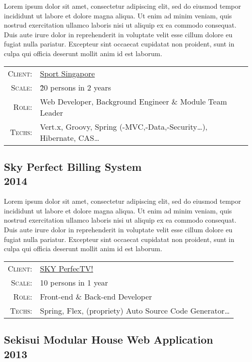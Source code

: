 \documentclass[a4paper,10pt]{article}
\begin{document}
Lorem ipsum dolor sit amet, consectetur adipiscing elit, sed do eiusmod tempor incididunt ut labore et dolore magna aliqua. Ut enim ad minim veniam, quis nostrud exercitation ullamco laboris nisi ut aliquip ex ea commodo consequat. Duis aute irure dolor in reprehenderit in voluptate velit esse cillum dolore eu fugiat nulla pariatur. Excepteur sint occaecat cupidatat non proident, sunt in culpa qui officia deserunt mollit anim id est laborum.

\begin{tabular}{rl}
    \textsc{Client:} & \href{http://www.sportsingapore.gov.sg/}{Sport Singapore}\\
    \textsc{Scale:} & \~20 persons in 2 years\\
    \textsc{Role:} & Web Developer, Background Engineer \& Module Team Leader\\
    \textsc{Techs:} & Vert.x, Groovy, Spring (-MVC,-Data,-Security\ldots), Hibernate, CAS\ldots\\
\end{tabular}


\subsection*{Sky Perfect Billing System\\\small 2014}

Lorem ipsum dolor sit amet, consectetur adipiscing elit, sed do eiusmod tempor incididunt ut labore et dolore magna aliqua. Ut enim ad minim veniam, quis nostrud exercitation ullamco laboris nisi ut aliquip ex ea commodo consequat. Duis aute irure dolor in reprehenderit in voluptate velit esse cillum dolore eu fugiat nulla pariatur. Excepteur sint occaecat cupidatat non proident, sunt in culpa qui officia deserunt mollit anim id est laborum.

\begin{tabular}{rl}
    \textsc{Client:} & \href{https://www.skyperfectv.co.jp/eng/}{SKY PerfecTV!}\\
    \textsc{Scale:} & 10 persons in 1 year\\
    \textsc{Role:} & Front-end \& Back-end Developer\\
    \textsc{Techs:} & Spring, Flex, (propriety) Auto Source Code Generator\ldots\\
\end{tabular}

\subsection*{Sekisui Modular House Web Application\\\small 2013}
\end{document}
